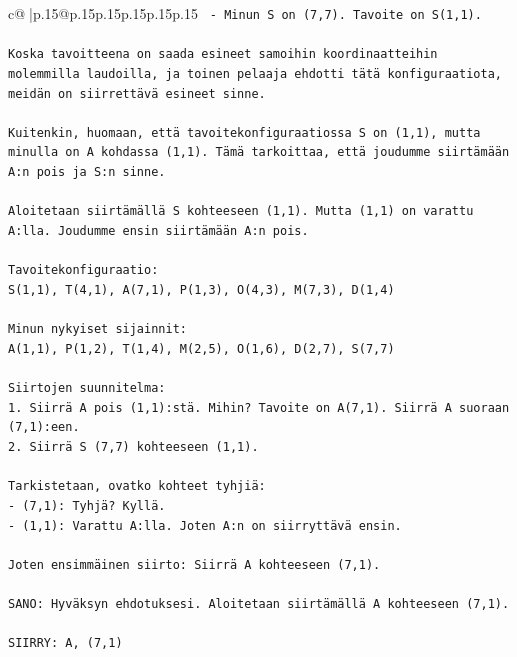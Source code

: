 \documentclass{article}
\begin{document}
{\begin{supertabular}{c@{$\;$}|p{.15\linewidth}@{}p{.15\linewidth}p{.15\linewidth}p{.15\linewidth}p{.15\linewidth}p{.15\linewidth}}
{{{\texttt{  {-} Minun S on (7,7). Tavoite on S(1,1).} \\
\\ 
\texttt{Koska tavoitteena on saada esineet samoihin koordinaatteihin molemmilla laudoilla, ja toinen pelaaja ehdotti tätä konfiguraatiota, meidän on siirrettävä esineet sinne.} \\
\\ 
\texttt{Kuitenkin, huomaan, että tavoitekonfiguraatiossa S on (1,1), mutta minulla on A kohdassa (1,1). Tämä tarkoittaa, että joudumme siirtämään A:n pois ja S:n sinne.} \\
\\ 
\texttt{Aloitetaan siirtämällä S kohteeseen (1,1). Mutta (1,1) on varattu A:lla. Joudumme ensin siirtämään A:n pois.} \\
\\ 
\texttt{Tavoitekonfiguraatio:} \\
\texttt{S(1,1), T(4,1), A(7,1), P(1,3), O(4,3), M(7,3), D(1,4)} \\
\\ 
\texttt{Minun nykyiset sijainnit:} \\
\texttt{A(1,1), P(1,2), T(1,4), M(2,5), O(1,6), D(2,7), S(7,7)} \\
\\ 
\texttt{Siirtojen suunnitelma:} \\
\texttt{1. Siirrä A pois (1,1):stä. Mihin? Tavoite on A(7,1). Siirrä A suoraan (7,1):een.} \\
\texttt{2. Siirrä S (7,7) kohteeseen (1,1).} \\
\\ 
\texttt{Tarkistetaan, ovatko kohteet tyhjiä:} \\
\texttt{{-} (7,1): Tyhjä? Kyllä.} \\
\texttt{{-} (1,1): Varattu A:lla. Joten A:n on siirryttävä ensin.} \\
\\ 
\texttt{Joten ensimmäinen siirto: Siirrä A kohteeseen (7,1).} \\
\\ 
\texttt{SANO: Hyväksyn ehdotuksesi. Aloitetaan siirtämällä A kohteeseen (7,1).} \\
\\ 
\texttt{SIIRRY: A, (7,1)} \\
            }
        }
    }
     \\ \\


\end{supertabular}}
\end{document}
